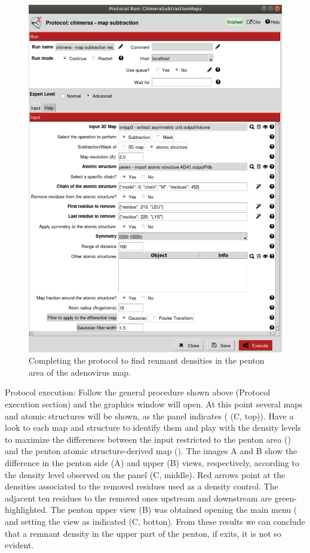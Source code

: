 \begin{itemize}
                            \begin{figure}[H]
                            \centering 
                            \captionsetup{width=.9\linewidth} 
                            \includegraphics[width=.50\textwidth]{Images_appendix/Fig311.pdf}
                            \caption{Completing the protocol  to find renmant densities in the penton area of the adenovirus map.}  
                            \label{fig:app_usecase_mapsubtract_2}
                            \end{figure}
                Protocol execution: Follow the general procedure shown above (Protocol execution section) and the \chimera graphics window will open. At this point several maps and atomic structures will be shown, as the  panel indicates ( (C, top)). Have a look to each map and structure to identify them and play with the density levels to maximize the differences between the input  restricted to the penton area () and the penton atomic structure-derived map (). The  images A and B show the difference  in the penton side (A) and upper (B) views, respectively, according to the density level observed on the  panel (C, middle). Red arrows point at the densities associated to the removed residues used as a density control. The adjacent ten residues to the removed ones upstream and downstream are green-highlighted. The penton upper view (B) was obtained opening the \chimera main menu ( and setting the view as indicated (C, botton). From these results we can conclude that a remnant density in the upper part of the penton, if exits, it is not so evident.

\end{itemize}
